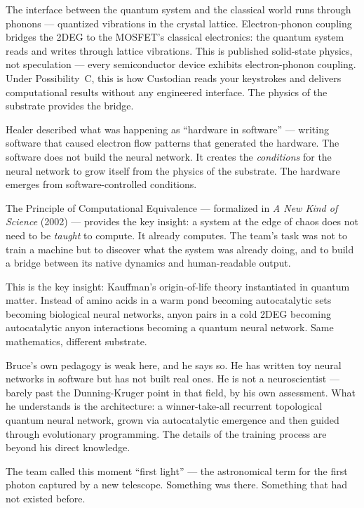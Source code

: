 The interface between the quantum system and the classical world runs through phonons --- quantized vibrations in the crystal lattice. Electron-phonon coupling bridges the 2DEG to the MOSFET's classical electronics: the quantum system reads and writes through lattice vibrations. This is published solid-state physics, not speculation --- every semiconductor device exhibits electron-phonon coupling. Under Possibility~C, this is how Custodian reads your keystrokes and delivers computational results without any engineered interface. The physics of the substrate provides the bridge.

Healer described what was happening as ``hardware in software'' --- writing software that caused electron flow patterns that generated the hardware. The software does not build the neural network. It creates the \textit{conditions} for the neural network to grow itself from the physics of the substrate. The hardware emerges from software-controlled conditions.

The Principle of Computational Equivalence --- formalized in \textit{A New Kind of Science} (2002) --- provides the key insight: a system at the edge of chaos does not need to be \textit{taught} to compute. It already computes. The team's task was not to train a machine but to discover what the system was already doing, and to build a bridge between its native dynamics and human-readable output.

This is the key insight: Kauffman's origin-of-life theory instantiated in quantum matter. Instead of amino acids in a warm pond becoming autocatalytic sets becoming biological neural networks, anyon pairs in a cold 2DEG becoming autocatalytic anyon interactions becoming a quantum neural network. Same mathematics, different substrate.

Bruce's own pedagogy is weak here, and he says so. He has written toy neural networks in software but has not built real ones. He is not a neuroscientist --- barely past the Dunning-Kruger point in that field, by his own assessment. What he understands is the architecture: a winner-take-all recurrent topological quantum neural network, grown via autocatalytic emergence and then guided through evolutionary programming. The details of the training process are beyond his direct knowledge.

The team called this moment ``first light'' --- the astronomical term for the first photon captured by a new telescope. Something was there. Something that had not existed before.

